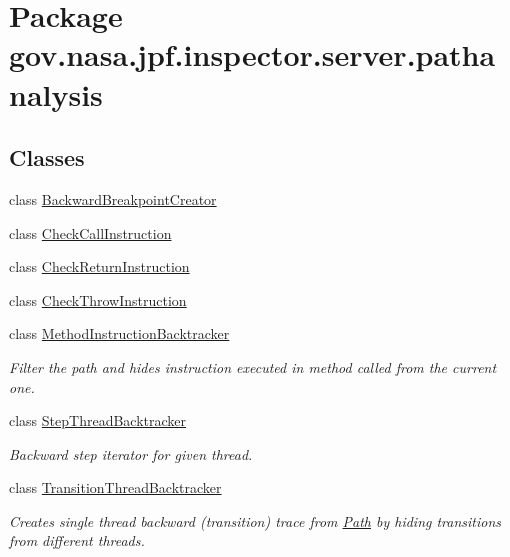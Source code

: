 \hypertarget{namespacegov_1_1nasa_1_1jpf_1_1inspector_1_1server_1_1pathanalysis}{}\section{Package gov.\+nasa.\+jpf.\+inspector.\+server.\+pathanalysis}
\label{namespacegov_1_1nasa_1_1jpf_1_1inspector_1_1server_1_1pathanalysis}
\subsection*{Classes}
\begin{DoxyCompactItemize}
\item 
class \hyperlink{classgov_1_1nasa_1_1jpf_1_1inspector_1_1server_1_1pathanalysis_1_1_backward_breakpoint_creator}{Backward\+Breakpoint\+Creator}
\item 
class \hyperlink{classgov_1_1nasa_1_1jpf_1_1inspector_1_1server_1_1pathanalysis_1_1_check_call_instruction}{Check\+Call\+Instruction}
\item 
class \hyperlink{classgov_1_1nasa_1_1jpf_1_1inspector_1_1server_1_1pathanalysis_1_1_check_return_instruction}{Check\+Return\+Instruction}
\item 
class \hyperlink{classgov_1_1nasa_1_1jpf_1_1inspector_1_1server_1_1pathanalysis_1_1_check_throw_instruction}{Check\+Throw\+Instruction}
\item 
class \hyperlink{classgov_1_1nasa_1_1jpf_1_1inspector_1_1server_1_1pathanalysis_1_1_method_instruction_backtracker}{Method\+Instruction\+Backtracker}
\begin{DoxyCompactList}\small\item\em Filter the path and hides instruction executed in method called from the current one. \end{DoxyCompactList}\item 
class \hyperlink{classgov_1_1nasa_1_1jpf_1_1inspector_1_1server_1_1pathanalysis_1_1_step_thread_backtracker}{Step\+Thread\+Backtracker}
\begin{DoxyCompactList}\small\item\em Backward step iterator for given thread. \end{DoxyCompactList}\item 
class \hyperlink{classgov_1_1nasa_1_1jpf_1_1inspector_1_1server_1_1pathanalysis_1_1_transition_thread_backtracker}{Transition\+Thread\+Backtracker}
\begin{DoxyCompactList}\small\item\em Creates single thread backward (transition) trace from \hyperlink{}{Path} by hiding transitions from different threads. \end{DoxyCompactList}\end{DoxyCompactItemize}
